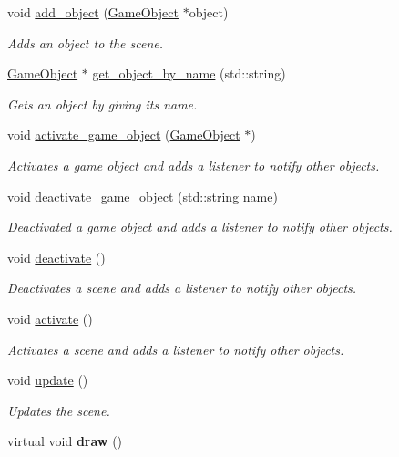 \begin{DoxyCompactItemize}
\item 
void \hyperlink{classengine_1_1_scene_a1d7c1960d764159416a5eb332d0d2203}{add\+\_\+object} (\hyperlink{classengine_1_1_game_object}{Game\+Object} $\ast$object)
\begin{DoxyCompactList}\small\item\em Adds an object to the scene. \end{DoxyCompactList}\item 
\hyperlink{classengine_1_1_game_object}{Game\+Object} $\ast$ \hyperlink{classengine_1_1_scene_a565ca4778b3c81ac6b3434820d0a4cfa}{get\+\_\+object\+\_\+by\+\_\+name} (std\+::string)
\begin{DoxyCompactList}\small\item\em Gets an object by giving its name. \end{DoxyCompactList}\item 
void \hyperlink{classengine_1_1_scene_af63b3b770464494c0cdb56a7a13b50fb}{activate\+\_\+game\+\_\+object} (\hyperlink{classengine_1_1_game_object}{Game\+Object} $\ast$)
\begin{DoxyCompactList}\small\item\em Activates a game object and adds a listener to notify other objects. \end{DoxyCompactList}\item 
void \hyperlink{classengine_1_1_scene_af9c8a6de10c3d49300183f68cefadb39}{deactivate\+\_\+game\+\_\+object} (std\+::string name)
\begin{DoxyCompactList}\small\item\em Deactivated a game object and adds a listener to notify other objects. \end{DoxyCompactList}\item 
void \hyperlink{classengine_1_1_scene_ad8fa30fc96100daf9f028922bb435daa}{deactivate} ()
\begin{DoxyCompactList}\small\item\em Deactivates a scene and adds a listener to notify other objects. \end{DoxyCompactList}\item 
void \hyperlink{classengine_1_1_scene_adf671a288f878e3efa42ccbf34b0d6ed}{activate} ()
\begin{DoxyCompactList}\small\item\em Activates a scene and adds a listener to notify other objects. \end{DoxyCompactList}\item 
void \hyperlink{classengine_1_1_scene_aa24c7e636c10e4e42650c1374b90bb80}{update} ()
\begin{DoxyCompactList}\small\item\em Updates the scene. \end{DoxyCompactList}\item 
virtual void {\bfseries draw} ()\hypertarget{classengine_1_1_scene_a257bc5515bb3e5af364fee377c431271}{}\label{classengine_1_1_scene_a257bc5515bb3e5af364fee377c431271}


\end{DoxyCompactItemize}
